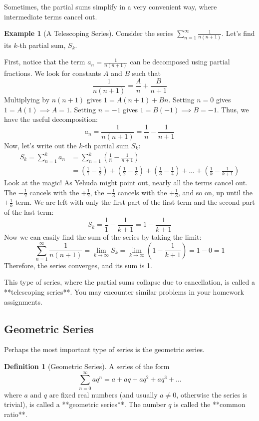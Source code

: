 \documentclass[11pt]{article}
\theoremstyle{definition}
\newtheorem{definition}[theorem]{Definition}
\newtheorem{example}[theorem]{Example}
\theoremstyle{remark}
\begin{document}
Sometimes, the partial sums simplify in a very convenient way, where intermediate terms cancel out.

\begin{example}[A Telescoping Series] \label{ex:telescoping}
Consider the series $\sum_{n=1}^{\infty} \frac{1}{n(n+1)}$. Let's find its $k$-th partial sum, $S_k$.

First, notice that the term $a_n = \frac{1}{n(n+1)}$ can be decomposed using partial fractions. We look for constants $A$ and $B$ such that
\[ \frac{1}{n(n+1)} = \frac{A}{n} + \frac{B}{n+1} \]
Multiplying by $n(n+1)$ gives $1 = A(n+1) + Bn$.
Setting $n=0$ gives $1 = A(1) \implies A=1$.
Setting $n=-1$ gives $1 = B(-1) \implies B=-1$.
Thus, we have the useful decomposition:
\[ a_n = \frac{1}{n(n+1)} = \frac{1}{n} - \frac{1}{n+1} \]
Now, let's write out the $k$-th partial sum $S_k$:
\begin{align*} S_k = \sum_{n=1}^{k} a_n &= \sum_{n=1}^{k} \left( \frac{1}{n} - \frac{1}{n+1} \right) \\ &= \left( \frac{1}{1} - \frac{1}{2} \right) + \left( \frac{1}{2} - \frac{1}{3} \right) + \left( \frac{1}{3} - \frac{1}{4} \right) + \dots + \left( \frac{1}{k} - \frac{1}{k+1} \right) \end{align*}
Look at the magic! As Yehuda might point out, nearly all the terms cancel out. The $-\frac{1}{2}$ cancels with the $+\frac{1}{2}$, the $-\frac{1}{3}$ cancels with the $+\frac{1}{3}$, and so on, up until the $+\frac{1}{k}$ term. We are left with only the first part of the first term and the second part of the last term:
\[ S_k = \frac{1}{1} - \frac{1}{k+1} = 1 - \frac{1}{k+1} \]
Now we can easily find the sum of the series by taking the limit:
\[ \sum_{n=1}^{\infty} \frac{1}{n(n+1)} = \lim_{k \to \infty} S_k = \lim_{k \to \infty} \left( 1 - \frac{1}{k+1} \right) = 1 - 0 = 1 \]
Therefore, the series converges, and its sum is 1.

This type of series, where the partial sums collapse due to cancellation, is called a **telescoping series**. You may encounter similar problems in your homework assignments.
\end{example}

\subsection{Geometric Series}

Perhaps the most important type of series is the geometric series.

\begin{definition}[Geometric Series]
A series of the form
\[ \sum_{n=0}^{\infty} a q^n = a + aq + aq^2 + aq^3 + \dots \]
where $a$ and $q$ are fixed real numbers (and usually $a \neq 0$, otherwise the series is trivial), is called a **geometric series**. The number $q$ is called the **common ratio**.
\end{definition}
\end{document}
